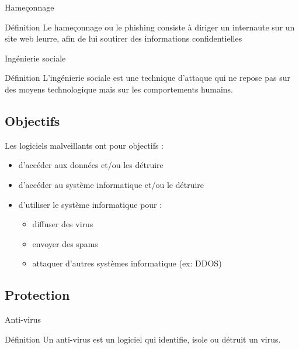 \documentclass[12pt]{beamer}
\begin{document}
		\begin{frame}{Hameçonnage}
			\begin{exampleblock}{Définition}
				Le \alert{hameçonnage} ou le \alert{phishing} consiste à diriger un internaute sur un site web leurre, afin de lui soutirer des informations confidentielles
			\end{exampleblock}
		\end{frame}
		
		\begin{frame}{Ingénierie sociale}
			\begin{exampleblock}{Définition}
				L'\alert{ingénierie sociale} est une technique d'attaque qui ne repose pas sur des moyens technologique mais sur les comportements humains.
			\end{exampleblock}
		\end{frame}	
		
	\subsection{Objectifs}	
	
		\begin{frame}
			Les \alert{logiciels malveillants} ont pour objectifs :
				\begin{itemize}
					\item d'accéder aux données et/ou les détruire
					\item d'accéder au système informatique et/ou le détruire
					\item d'utiliser le système informatique pour :
						\begin{itemize}
							\item diffuser des virus
							\item envoyer des spams
							\item attaquer d'autres systèmes informatique (ex: DDOS)
						\end{itemize}
				\end{itemize}
		\end{frame}
		
	\subsection{Protection}
	
		\begin{frame}{Anti-virus}
			\begin{exampleblock}{Définition}
				Un \alert{anti-virus} est un logiciel qui identifie, isole ou détruit un virus.
			\end{exampleblock}
		\end{frame}
\end{document}
